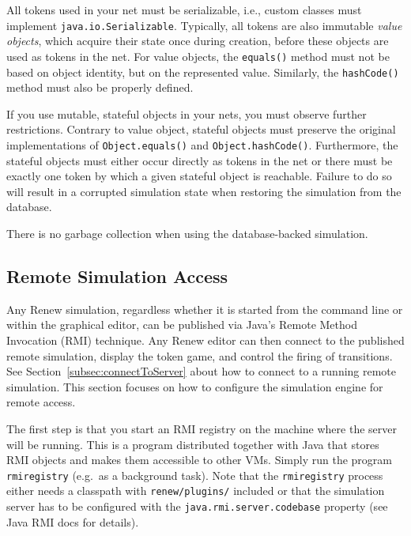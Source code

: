 All tokens used in your net must be serializable, i.e.,
custom classes must implement \texttt{java.io.Serializable}.
Typically, all tokens are also immutable \emph{value objects},
which acquire their state once during creation, before these 
objects are used as tokens in the net.
For value objects, the \texttt{equals()} method must not be based on
object identity, but on the represented value. 
Similarly, the \texttt{hashCode()} method
must also be properly defined.

If you use mutable, stateful objects in your nets, you
must observe further restrictions. Contrary to value object,
stateful objects must preserve the original implementations
of \texttt{Object.equals()} and \texttt{Object.hashCode()}.
Furthermore, the stateful objects must either
occur directly as tokens in the net or there must be exactly
one token by which a given stateful object is reachable.
Failure to do so will result in a corrupted simulation
state when restoring the simulation from the database.

There is no garbage collection when using the database-backed
simulation.

\subsection{Remote Simulation Access}
\label{subsec:remoteSetup}

Any Renew simulation, regardless whether it is
started from the command line or within the graphical editor,
can be published via Java's Remote Method Invocation (RMI)
technique.
Any Renew editor can then connect to the published remote
simulation, display the token game, and control the firing of
transitions.
See Section~\ref{subsec:connectToServer} about how to connect to
a running remote simulation.
This section focuses on how to configure the simulation engine
for remote access.

The first step is that you start an RMI registry on the machine where
the server will be running. This is a program distributed together
with Java that stores RMI objects and makes them accessible to other
VMs. Simply run the program \texttt{rmiregistry}
(e.g.\ as a background task).
Note that the \texttt{rmiregistry} process either needs a
classpath with \texttt{renew\renewversion/plugins/\PluginRemote{}}
included or that the simulation server has to be configured with
the \texttt{java.rmi.server.codebase} property (see Java RMI docs
for details).


